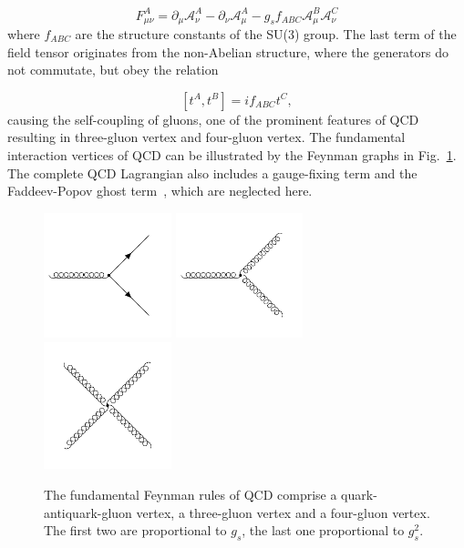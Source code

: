\begin{equation*}
    F_{\mu\nu}^A = \partial_\mu \mathcal{A}_\nu^A - \partial_{\nu}
    \mathcal{A}_{\mu}^A - g_s f_{ABC} \mathcal{A}_{\mu}^B
    \mathcal{A}_{\nu}^C
\end{equation*}
%
where $f_{ABC}$ are the structure constants of the SU(3) group. The last term of
the field tensor originates from the non-Abelian structure, where the generators
do not commutate, but obey the relation

\begin{equation*}
    \left[t^A, t^B \right] = if_{ABC} t^{C},
\end{equation*}
%
causing the self-coupling of gluons, one of the prominent features of QCD
resulting in three-gluon vertex and four-gluon vertex. The fundamental
interaction vertices of QCD can be illustrated by the Feynman graphs in
Fig.~\ref{fig:fundamental_couplings}. The complete QCD Lagrangian also includes
a gauge-fixing term and the Faddeev-Popov ghost term~\cite{Faddeev:1967fc},
which are neglected here.

\begin{figure}[htb] 
    \centering
    \includegraphics[width=0.33\textwidth]{figures/drawings/feynman/gqq.pdf}\hfill
    \includegraphics[width=0.33\textwidth]{figures/drawings/feynman/ggg.pdf}\hfill
    \includegraphics[width=0.33\textwidth]{figures/drawings/feynman/gggg.pdf}\hfill
    \caption[Fundamental vertices of QCD]{The fundamental Feynman rules of QCD
    comprise a quark-antiquark-gluon vertex, a three-gluon vertex and a four-gluon
    vertex. The first two are proportional to $g_{s}$, the last one
    proportional to $g_{s}^2$.} 
    \label{fig:fundamental_couplings} 
\end{figure}

